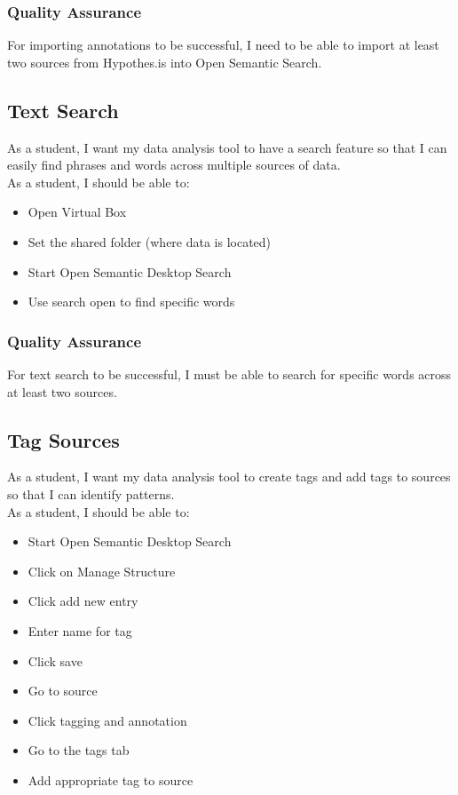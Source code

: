 \documentclass{article}
\begin{document}
\subsubsection{Quality Assurance}
For importing annotations to be successful, I need to be able to import at least two sources from Hypothes.is into Open Semantic Search.

\subsection{Text Search}
As a student, I want my data analysis tool to have a search feature so that I can easily find phrases and words across multiple sources of data.\\

As a student, I should be able to:
\begin{itemize}
    \item Open Virtual Box
    \item Set the shared folder (where data is located)
    \item Start Open Semantic Desktop Search 
    \item Use search open to find specific words
\end{itemize}

\subsubsection{Quality Assurance}
For text search to be successful, I must be able to search for specific words across at least two sources.

\subsection{Tag Sources}
As a student, I want my data analysis tool to create tags and add tags to sources so that I can identify patterns.\\

As a student, I should be able to:
\begin{itemize}
    \item Start Open Semantic Desktop Search 
    \item Click on Manage Structure 
    \item Click add new entry
    \item Enter name for tag
    \item Click save
    \item Go to source
    \item Click tagging and annotation 
    \item Go to the tags tab 
    \item Add appropriate tag to source
\end{itemize}
\end{document}
